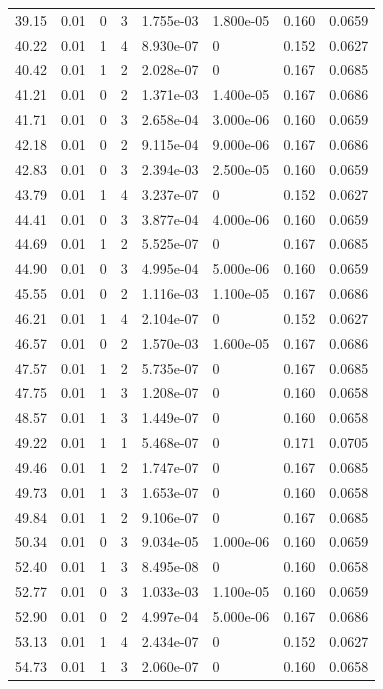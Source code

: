 \documentclass[preview]{standalone}
\begin{document}
{{{\begin{tabular}{L{1.2cm}C{1.2cm} C{0.3cm}C{0.5cm} C{1.4cm}C{1.4cm} C{1.4cm}C{1.4cm}}
  39.15  &  0.01  & 0     &  3 &  1.755e-03  & 1.800e-05  & 0.160 &  0.0659   \\ 
  40.22  &  0.01  & 1     &  4 &  8.930e-07  & 0  & 0.152 &  0.0627   \\ 
  40.42  &  0.01  & 1     &  2 &  2.028e-07  & 0  & 0.167 &  0.0685   \\ 
  41.21  &  0.01  & 0     &  2 &  1.371e-03  & 1.400e-05  & 0.167 &  0.0686   \\ 
  41.71  &  0.01  & 0     &  3 &  2.658e-04  & 3.000e-06  & 0.160 &  0.0659   \\ 
  42.18  &  0.01  & 0     &  2 &  9.115e-04  & 9.000e-06  & 0.167 &  0.0686   \\ 
  42.83  &  0.01  & 0     &  3 &  2.394e-03  & 2.500e-05  & 0.160 &  0.0659   \\ 
  43.79  &  0.01  & 1     &  4 &  3.237e-07  & 0  & 0.152 &  0.0627   \\ 
  44.41  &  0.01  & 0     &  3 &  3.877e-04  & 4.000e-06  & 0.160 &  0.0659   \\ 
  44.69  &  0.01  & 1     &  2 &  5.525e-07  & 0  & 0.167 &  0.0685   \\ 
  44.90  &  0.01  & 0     &  3 &  4.995e-04  & 5.000e-06  & 0.160 &  0.0659   \\ 
  45.55  &  0.01  & 0     &  2 &  1.116e-03  & 1.100e-05  & 0.167 &  0.0686   \\ 
  46.21  &  0.01  & 1     &  4 &  2.104e-07  & 0  & 0.152 &  0.0627   \\ 
  46.57  &  0.01  & 0     &  2 &  1.570e-03  & 1.600e-05  & 0.167 &  0.0686   \\ 
  47.57  &  0.01  & 1     &  2 &  5.735e-07  & 0  & 0.167 &  0.0685   \\ 
  47.75  &  0.01  & 1     &  3 &  1.208e-07  & 0  & 0.160 &  0.0658   \\ 
  48.57  &  0.01  & 1     &  3 &  1.449e-07  & 0  & 0.160 &  0.0658   \\ 
  49.22  &  0.01  & 1     &  1 &  5.468e-07  & 0  & 0.171 &  0.0705   \\ 
  49.46  &  0.01  & 1     &  2 &  1.747e-07  & 0  & 0.167 &  0.0685   \\ 
  49.73  &  0.01  & 1     &  3 &  1.653e-07  & 0  & 0.160 &  0.0658   \\ 
  49.84  &  0.01  & 1     &  2 &  9.106e-07  & 0  & 0.167 &  0.0685   \\ 
  50.34  &  0.01  & 0     &  3 &  9.034e-05  & 1.000e-06  & 0.160 &  0.0659   \\ 
  52.40  &  0.01  & 1     &  3 &  8.495e-08  & 0  & 0.160 &  0.0658   \\ 
  52.77  &  0.01  & 0     &  3 &  1.033e-03  & 1.100e-05  & 0.160 &  0.0659   \\ 
  52.90  &  0.01  & 0     &  2 &  4.997e-04  & 5.000e-06  & 0.167 &  0.0686   \\ 
  53.13  &  0.01  & 1     &  4 &  2.434e-07  & 0  & 0.152 &  0.0627   \\ 
  54.73  &  0.01  & 1     &  3 &  2.060e-07  & 0  & 0.160 &  0.0658   \\ 
\hline 
\end{tabular} 

}}}
\end{document}
